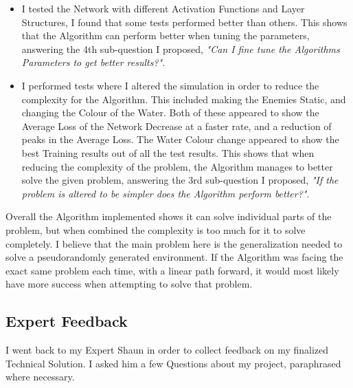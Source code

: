 \begin{flushleft}
\begin{itemize}
            \item I tested the Network with different Activation Functions and Layer Structures, I found that some tests performed better than others.
            This shows that the Algorithm can perform better when tuning the parameters, answering the 4th sub-question I proposed, 
            \textit{"Can I fine tune the Algorithms Parameters to get better results?"}. \\
            \vspace{0.2cm}

            \item I performed tests where I altered the simulation in order to reduce the complexity for the Algorithm. This included making the 
            Enemies Static, and changing the Colour of the Water. Both of these appeared to show the Average Loss of the Network Decrease at
            a faster rate, and a reduction of peaks in the Average Loss. The Water Colour change appeared to show the best Training results out of all
            the test results. This shows that when reducing the complexity of the problem, the Algorithm manages to better solve the given problem,
            answering the 3rd sub-question I proposed, \textit{"If the problem is altered to be simpler does the Algorithm perform better?"}.\\
            \vspace{0.2cm}
        \end{itemize}

        Overall the Algorithm implemented shows it can solve individual parts of the problem, but when combined the complexity
        is too much for it to solve completely. I believe that the main problem here is the generalization needed to solve a pseudorandomly
        generated environment. If the Algorithm was facing the exact same problem each time, with a linear path forward, it would most likely
        have more success when attempting to solve that problem.
    \subsection{Expert Feedback}
        \vspace{0.2cm}
        I went back to my Expert Shaun in order to collect feedback on my finalized Technical Solution. I asked him a few Questions about my
        project, paraphrased where necessary. \\
        \vspace{0.5cm}


\end{flushleft}
